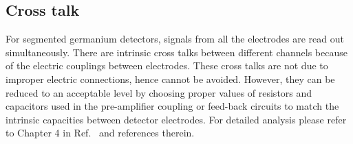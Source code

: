 \subsection{Cross talk}
\label{sec:det:xtalk}
For segmented germanium detectors, signals from all the electrodes are read out simultaneously. There are intrinsic cross talks between different channels because of the electric couplings between electrodes. These cross talks are not due to improper electric connections, hence cannot be avoided. However, they can be reduced to an acceptable level by choosing proper values of resistors and capacitors used in the pre-amplifier coupling or feed-back circuits to match the intrinsic capacities between detector electrodes. For detailed analysis please refer to Chapter 4 in Ref.~\cite{Bru06} and references therein.


